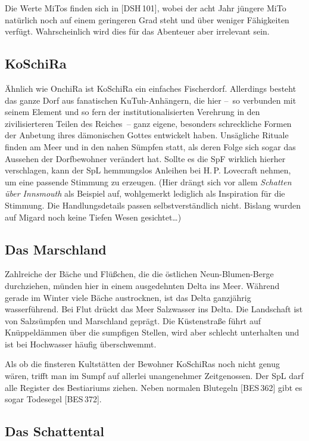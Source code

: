 \documentclass[
a4paper,
twoside,
DIV=calc,
BCOR=4mm,
fontsize=9pt,
twocolumn=on,
titlepage=on,
parskip=half
]{scrartcl}
\begin{document}
Die Werte MiTos finden sich in [DSH\,101], wobei der acht Jahr jüngere
MiTo natürlich noch auf einem geringeren Grad steht und über weniger
Fähigkeiten verfügt. Wahrscheinlich wird dies für das Abenteuer aber
irrelevant sein.

\subsection{KoSchiRa}

Ähnlich wie OnchiRa ist KoSchiRa ein einfaches Fischerdorf. Allerdings
besteht das ganze Dorf aus fanatischen KuTuh-Anhängern, die hier --~so
verbunden mit seinem Element und so fern der institutionalisierten
Verehrung in den zivilisierteren Teilen des Reiches~-- ganz eigene,
besonders schreckliche Formen der Anbetung ihres dämonischen Gottes
entwickelt haben. Unsägliche Rituale finden am Meer und in den nahen
Sümpfen statt, als deren Folge sich sogar das Aussehen der
Dorfbewohner verändert hat. Sollte es die SpF wirklich hierher
verschlagen, kann der SpL hemmungslos Anleihen bei H.\,P. Lovecraft
nehmen, um eine passende Stimmung zu erzeugen. (Hier drängt sich vor
allem \emph{Schatten über Innsmouth} als Beispiel auf, wohlgemerkt
lediglich als Inspiration für die Stimmung. Die Handlungsdetails
passen selbstverständlich nicht. Bislang wurden auf Migard noch keine
Tiefen Wesen gesichtet\dots)

\subsection{Das Marschland}

Zahlreiche der Bäche und Flüßchen, die die östlichen Neun-Blumen-Berge
durchziehen, münden hier in einem ausgedehnten Delta ins Meer. Während
gerade im Winter viele Bäche austrocknen, ist das Delta ganzjährig
wasserführend. Bei Flut drückt das Meer Salzwasser ins Delta. Die
Landschaft ist von Salzsümpfen und Marschland geprägt. Die
Küstenstraße führt auf Knüppeldämmen über die sumpfigen Stellen, wird
aber schlecht unterhalten und ist bei Hochwasser häufig überschwemmt.

Als ob die finsteren Kultstätten der Bewohner KoSchiRas noch nicht
genug wären, trifft man im Sumpf auf allerlei unangenehmer
Zeitgenossen. Der SpL darf alle Register des Bestiariums ziehen. Neben
normalen Blutegeln [BES\,362] gibt es sogar Todesegel [BES\,372].

\subsection{Das Schattental}
\end{document}
